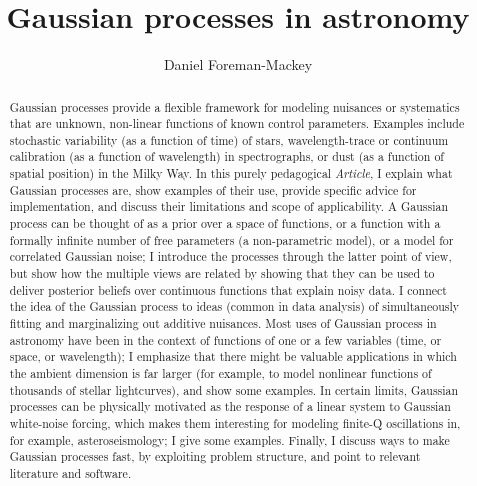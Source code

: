 \documentclass[modern, letterpaper]{aastex61}
\newcommand{\documentname}{\textsl{Article}}
\begin{document}
\sloppy\sloppypar\raggedbottom\frenchspacing

\title{Gaussian processes in astronomy}


\author[0000-0002-9328-5652]{Daniel Foreman-Mackey}

\begin{abstract}\noindent
Gaussian processes provide a flexible framework
for modeling nuisances or systematics that are unknown, non-linear functions of known
control parameters.
Examples include stochastic variability (as a function of time) of stars, wavelength-trace
or continuum calibration (as a function of wavelength) in spectrographs,
or dust (as a function of spatial position) in the Milky Way.
In this purely pedagogical \documentname, I explain what Gaussian processes are,
show examples of their use, provide specific advice for implementation, and discuss their
limitations and scope of applicability.
A Gaussian process can be thought of as a prior over a space of functions,
or a function with a formally infinite number of free parameters (a non-parametric model),
or a model for correlated Gaussian noise;
I introduce the processes through the latter point of view, but show how the multiple
views are related by showing that they can be used to deliver posterior beliefs
over continuous functions that explain noisy data.
I connect the idea of the Gaussian process to ideas (common in
data analysis) of simultaneously fitting and marginalizing out additive nuisances.
Most uses of Gaussian process in astronomy have been in the context of functions of one
or a few variables (time, or space, or wavelength); I emphasize that there might be
valuable applications in which the ambient dimension is far larger (for example, to model
nonlinear functions of thousands of stellar lightcurves), and show some examples.
In certain limits, Gaussian processes can be physically motivated as the response
of a linear system to Gaussian white-noise forcing, which makes them interesting for
modeling finite-Q oscillations in, for example, asteroseismology; I give some examples.
Finally, I discuss ways to make Gaussian processes fast, by exploiting problem structure,
and point to relevant literature and software.
\end{abstract}
\end{document}
